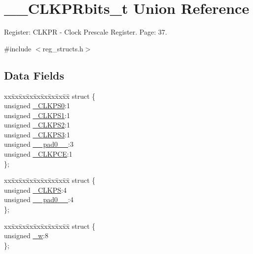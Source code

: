 \hypertarget{union_____c_l_k_p_rbits__t}{\section{\+\_\+\+\_\+\+C\+L\+K\+P\+Rbits\+\_\+t Union Reference}
\label{union_____c_l_k_p_rbits__t}
}


Register\+: C\+L\+K\+P\+R -\/ Clock Prescale Register. Page\+: 37.  




{\ttfamily \#include $<$reg\+\_\+structs.\+h$>$}

\subsection*{Data Fields}
\begin{DoxyCompactItemize}
\item 
\begin{tabbing}
xx\=xx\=xx\=xx\=xx\=xx\=xx\=xx\=xx\=\kill
struct \{\\
\>unsigned \hyperlink{union_____c_l_k_p_rbits__t_a7770e1806d800b7d1c7b1db4ae636dbd}{\_CLKPS0}:1\\
\>unsigned \hyperlink{union_____c_l_k_p_rbits__t_a02d5d2eabfd85fe9d9bee979f8488849}{\_CLKPS1}:1\\
\>unsigned \hyperlink{union_____c_l_k_p_rbits__t_a13435b83e03b4a80053a69fb95a40a88}{\_CLKPS2}:1\\
\>unsigned \hyperlink{union_____c_l_k_p_rbits__t_a4922be5fcb6d05dcbef968fe24bbddd9}{\_CLKPS3}:1\\
\>unsigned \hyperlink{union_____c_l_k_p_rbits__t_a970fee87731fbd8d329ca4b723bde70c}{\_\_pad0\_\_}:3\\
\>unsigned \hyperlink{union_____c_l_k_p_rbits__t_a16d72d432ba11651e97f6e0872fea02b}{\_CLKPCE}:1\\
\}; \\

\end{tabbing}\item 
\begin{tabbing}
xx\=xx\=xx\=xx\=xx\=xx\=xx\=xx\=xx\=\kill
struct \{\\
\>unsigned \hyperlink{union_____c_l_k_p_rbits__t_a31fa535b2cbb7eb8c3175200ed4586bf}{\_CLKPS}:4\\
\>unsigned \hyperlink{union_____c_l_k_p_rbits__t_a970fee87731fbd8d329ca4b723bde70c}{\_\_pad0\_\_}:4\\
\}; \\

\end{tabbing}\item 
\begin{tabbing}
xx\=xx\=xx\=xx\=xx\=xx\=xx\=xx\=xx\=\kill
struct \{\\
\>unsigned \hyperlink{union_____c_l_k_p_rbits__t_a0de45f468d3a9cc657bffdefd555ac22}{\_w}:8\\
\}; \\

\end{tabbing}\end{DoxyCompactItemize}


